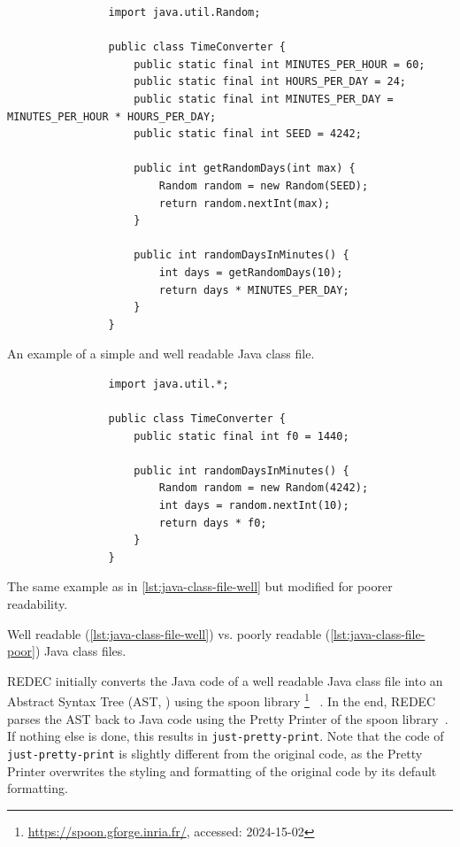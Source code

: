 \documentclass[%
class=scrreprt,
chapterprefix=false,%
open=right,%
twoside=true,%
paper=a4,%
logofile={Logo\_zentral\_farbig\_EN.png},%
thesistype=master,%
UKenglish,%
]{se2thesis}
\newcounter{urlfootnote}
\newcommand{\onecurl}[2]{%
	\stepcounter{urlfootnote}%
	\expandafter\def\csname urlfootnote:#1\endcsname{\theurlfootnote}%
	\footnote{\label{url:#1}\url{#1}, accessed: #2}%
}
\newcommand{\curl}[2]{%
		\onecurl{#1}{#2}%
}
\theoremstyle{definition}
\newcommand{\rdh}{REDEC\xspace}
\newcommand{\none}{just-pretty-print\xspace} %
\newcommand{\nonet}{\texttt{\none}\xspace} %
\begin{document}
	\begin{listing}[p]
		\begin{sublisting}{\linewidth}
			\begin{verbatim}
				import java.util.Random;
				
				public class TimeConverter {
					public static final int MINUTES_PER_HOUR = 60;
					public static final int HOURS_PER_DAY = 24;
					public static final int MINUTES_PER_DAY = MINUTES_PER_HOUR * HOURS_PER_DAY;
					public static final int SEED = 4242;
					
					public int getRandomDays(int max) {
						Random random = new Random(SEED);
						return random.nextInt(max);
					}
					
					public int randomDaysInMinutes() {
						int days = getRandomDays(10);
						return days * MINUTES_PER_DAY;
					}
				}
			\end{verbatim}
			\caption{An example of a simple and well readable Java class file.}
			\label{lst:java-class-file-well}
		\end{sublisting}
		
		\begin{sublisting}{\linewidth}
			\begin{verbatim}
				import java.util.*;
				
				public class TimeConverter {
					public static final int f0 = 1440;
					
					public int randomDaysInMinutes() {
						Random random = new Random(4242);
						int days = random.nextInt(10);
						return days * f0;
					}
				}
			\end{verbatim}
			\caption{The same example as in \autoref{lst:java-class-file-well} but modified for poorer readability.}
			\label{lst:java-class-file-poor}
		\end{sublisting}
		\caption{Well readable (\autoref{lst:java-class-file-well}) vs. poorly readable (\autoref{lst:java-class-file-poor}) Java class files.}
		\label{lst:java-class-file}
	\end{listing}
	
	\rdh initially converts the Java code of a well readable Java class file into an Abstract Syntax Tree (AST, ) using the spoon library\curl{https://spoon.gforge.inria.fr/}{2024-15-02}~\cite{pawlak2016spoon}. In the end, \rdh parses the AST back to Java code using the Pretty Printer of the spoon library~\cite{pawlak2016spoon}. If nothing else is done, this results in \nonet. Note that the code of \nonet is slightly different from the original code, as the Pretty Printer overwrites the styling and formatting of the original code by its default formatting.
	
\end{document}
